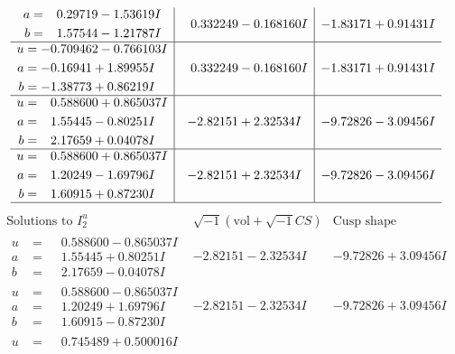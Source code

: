\documentclass[1p]{elsarticle_modified}
\theoremstyle{definition}
\newcommand{\I}{\sqrt{-1}}
\begin{document}
$$\begin{array}{c|c|c}
\begin{aligned}
a &= \phantom{-}0.29719 - 1.53619 I \\
b &= \phantom{-}1.57544 - 1.21787 I\end{aligned}
 & \phantom{-}0.332249 - 0.168160 I & -1.83171 + 0.91431 I \\ \hline\begin{aligned}
u &= -0.709462 - 0.766103 I \\
a &= -0.16941 + 1.89955 I \\
b &= -1.38773 + 0.86219 I\end{aligned}
 & \phantom{-}0.332249 - 0.168160 I & -1.83171 + 0.91431 I \\ \hline\begin{aligned}
u &= \phantom{-}0.588600 + 0.865037 I \\
a &= \phantom{-}1.55445 - 0.80251 I \\
b &= \phantom{-}2.17659 + 0.04078 I\end{aligned}
 & -2.82151 + 2.32534 I & -9.72826 - 3.09456 I \\ \hline\begin{aligned}
u &= \phantom{-}0.588600 + 0.865037 I \\
a &= \phantom{-}1.20249 - 1.69796 I \\
b &= \phantom{-}1.60915 + 0.87230 I\end{aligned}
 & -2.82151 + 2.32534 I & -9.72826 - 3.09456 I\\
 \hline 
 \end{array}$$\newpage$$\begin{array}{c|c|c}  
\text{Solutions to }I^u_{2}& \I (\text{vol} + \sqrt{-1}CS) & \text{Cusp shape}\\
 \hline 
\begin{aligned}
u &= \phantom{-}0.588600 - 0.865037 I \\
a &= \phantom{-}1.55445 + 0.80251 I \\
b &= \phantom{-}2.17659 - 0.04078 I\end{aligned}
 & -2.82151 - 2.32534 I & -9.72826 + 3.09456 I \\ \hline\begin{aligned}
u &= \phantom{-}0.588600 - 0.865037 I \\
a &= \phantom{-}1.20249 + 1.69796 I \\
b &= \phantom{-}1.60915 - 0.87230 I\end{aligned}
 & -2.82151 - 2.32534 I & -9.72826 + 3.09456 I \\ \hline\begin{aligned}
u &= \phantom{-}0.745489 + 0.500016 I \\

\end{aligned}
\end{array}$$
\end{document}
